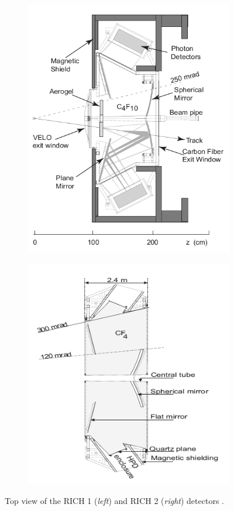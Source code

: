 \begin{figure}[t]
	\centering
	\begin{subfigure}{.45\textwidth}
		\includegraphics[height=.3\textheight]{graphics/02-lhcb/rich1_top.png}
		\caption{}
		\label{fig:2:rich_1_top}
	\end{subfigure}
	\begin{subfigure}{.45\textwidth}
		\includegraphics[height=.3\textheight]{graphics/02-lhcb/rich2_top.png}
		\caption{}
		\label{fig:2:rich_2_top}
	\end{subfigure}
	\caption[Top view of the two RICH detectors.]{Top view of the RICH 1 (\textit{left}) and RICH 2 (\textit{right}) detectors \cite{Alves:1129809}.}
	\label{fig:2:rich_top}
\end{figure}

